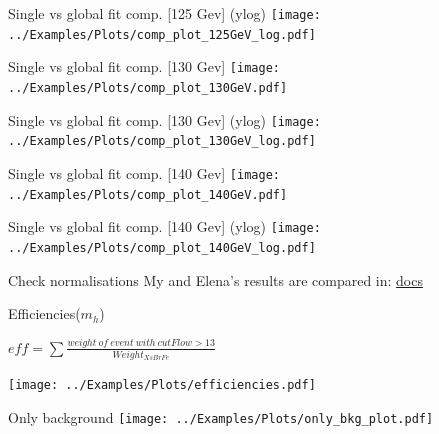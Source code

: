 \documentclass[10pt,UKenglish, leqno, xcolor = dvipsnames]{beamer}
\begin{document}
		\begin{frame}{Single vs global fit comp. [125 Gev] (ylog)}
			\vfill
			\texttt{[image: ../Examples/Plots/comp\_plot\_125GeV\_log.pdf]}
			\vfill
		\end{frame}
	
		\begin{frame}{Single vs global fit comp. [130 Gev]}
			\vfill
			\texttt{[image: ../Examples/Plots/comp\_plot\_130GeV.pdf]}
			\vfill
		\end{frame}
		
		\begin{frame}{Single vs global fit comp. [130 Gev] (ylog)}
			\vfill
			\texttt{[image: ../Examples/Plots/comp\_plot\_130GeV\_log.pdf]}
			\vfill
		\end{frame}
	
		\begin{frame}{Single vs global fit comp. [140 Gev]}
			\vfill
			\texttt{[image: ../Examples/Plots/comp\_plot\_140GeV.pdf]}
			\vfill
		\end{frame}
		
		\begin{frame}{Single vs global fit comp. [140 Gev] (ylog)}
			\vfill
			\texttt{[image: ../Examples/Plots/comp\_plot\_140GeV\_log.pdf]}
			\vfill
		\end{frame}
	
		\begin{frame}{Check normalisations}
			\vfill
			\centering
			My and Elena's results are compared in:
			\href{https://docs.google.com/spreadsheets/d/1HAke9uer_arNKmDrZkEBPS_DiHJFm9zSdsW57HAgCL4/edit?usp=sharing}{docs}
			\vfill
		\end{frame}
	
		\begin{frame}{Efficiencies($m_h$)}
			\vspace{.5cm}
			\begin{center}
				$eff = \sum\frac{weight\ of\ event\ with\ cutFlow>13}{Weight_{XsBrFe}}$
			\end{center}
			\vspace{.5cm}
			\begin{center}
				\texttt{[image: ../Examples/Plots/efficiencies.pdf]}
			\end{center}
		\end{frame}
	
		\begin{frame}{Only background}
			\vfill
			\texttt{[image: ../Examples/Plots/only\_bkg\_plot.pdf]}
			\vfill
		\end{frame}
	
\end{document}
